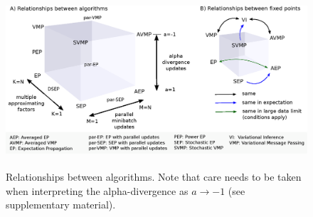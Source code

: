 
\begin{figure}
\centering
\def\svgwidth{1\linewidth}
\includegraphics[height=6.5cm]{fig/relationship-algorithms.eps}%
\caption{Relationships between algorithms. Note that care needs to be taken when interpreting the alpha-divergence as $a \rightarrow -1$ (see supplementary material).}
\label{fig:relationship-algorithms}
\end{figure}

